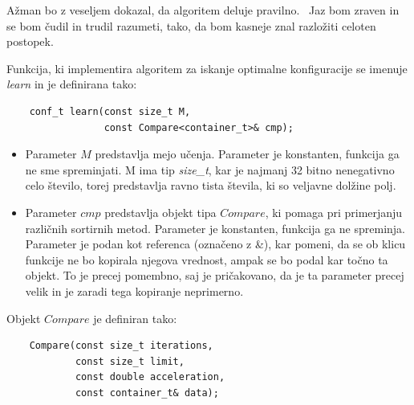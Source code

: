 \documentclass[a4paper,oneside,10pt]{article}
\begin{document}
Ažman bo z veseljem dokazal, da algoritem deluje pravilno. \smiley\  
Jaz bom zraven in se bom čudil in trudil razumeti, tako, da bom kasneje znal razložiti
celoten postopek. \blacksmiley

Funkcija, ki implementira algoritem za iskanje optimalne konfiguracije 
se imenuje \emph{learn} in je definirana tako:


\begin{lstlisting}
    conf_t learn(const size_t M, 
                 const Compare<container_t>& cmp);
\end{lstlisting}

\begin{itemize}
  \item Parameter $M$ predstavlja mejo učenja. Parameter je
    konstanten, funkcija ga ne sme spreminjati. M ima tip \emph{size\_t}, kar je najmanj 32
    bitno nenegativno celo število, torej predstavlja ravno tista števila, ki so veljavne
    dolžine polj.
  \item Parameter $cmp$ predstavlja objekt tipa $Compare$, ki pomaga pri primerjanju
    različnih sortirnih metod. Parameter je konstanten, funkcija ga ne spreminja.
    Parameter je podan kot referenca (označeno z \&), kar pomeni, da se ob klicu funkcije
    ne bo kopirala njegova vrednost, ampak se bo podal kar točno ta objekt. To je precej
    pomembno, saj je pričakovano, da je ta parameter precej velik in je zaradi tega
    kopiranje neprimerno. 
\end{itemize}

Objekt $Compare$ je definiran tako:
\begin{lstlisting}
    Compare(const size_t iterations, 
            const size_t limit, 
            const double acceleration, 
            const container_t& data);
\end{lstlisting}
\end{document}
